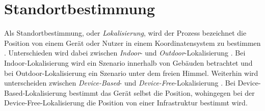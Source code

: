 \chapter{Standortbestimmung}
Als Standortbestimmung, oder \textit{Lokalisierung}, wird der Prozess bezeichnet die Position von einem Gerät oder Nutzer in einem Koordinatensystem zu bestimmen \cite{bulusu2000gps}.
Unterschieden wird dabei zwischen \textit{Indoor}- und \textit{Outdoor}-Lokalisierung \cite{zafari2019survey, bulusu2000gps}.
Bei Indoor-Lokalisierung wird ein Szenario innerhalb von Gebäuden betrachtet und bei Outdoor-Lokalisierung ein Szenario unter dem freien Himmel.
\newline
\newline
Weiterhin wird unterscheiden zwischen \textit{Device-Based}- und \textit{Device-Free}-Lokalisierung \cite{xiao2016survey}.
Bei Device-Based-Lokalisierung bestimmt das Gerät selbst die Position, wohingegen bei der Device-Free-Lokalisierung
die Position von einer Infrastruktur bestimmt wird.






